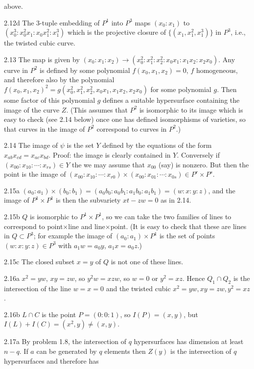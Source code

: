 above. 
\item{2.12d} The 3-tuple embedding of $P^1$ into $P^3$ 
maps $(x_0:x_1)$ to $(x_0^3:x_0^2x_1:x_0x_1^2:x_1^3)$
which is the projective closure of $\{(x_1,x_1^2,x_1^3)\}$ in $P^3$, 
i.e., the twisted cubic curve. 
\item{2.13} The map is given by $(x_0:x_1:x_2)\rightarrow
(x_0^2:x_1^2:x_2^2:x_0x_1:x_1x_2:x_2x_0)$. Any curve in $P^2$ 
is defined by some polynomial $f(x_0,x_1,x_2)=0$, $f$ homogeneous,
and therefore also by the polynomial $f(x_0,x_1,x_2)^2=
g(x_0^2,x_1^2,x_2^2,x_0x_1,x_1x_2,x_2x_0)$ for some polynomial $g$. 
Then some factor of this polynomial $g$ defines a suitable hypersurface containing
the image of the curve $Z$. (This assumes that $P^2$ is isomorphic to its
image which is easy to check (see 2.14 below) once one has defined isomorphisms
of varieties, so that curves in the image of $P^2$ correspond to curves
in $P^2$.)
\item{2.14} The image of $\psi$ is the set $Y$ defined by the equations 
of the form $x_{ab}x_{cd}= x_{ac}x_{bd}$. Proof: the image is clearly 
contained in $Y$. Conversely
if $(x_{00}:x_{10}:\cdots :x_{rs})\in Y$ the we may assume that 
$x_{00}$ (say) is nonzero. But then the point is the image of
$(x_{00}:x_{10}:\cdots :x_{r0})\times(x_{00}:x_{01}:\cdots :x_{0s})\in
P^r\times P^s$. 
\item{2.15a} $(a_0:a_1)\times(b_0:b_1)= (a_0b_0:a_0b_1:a_1b_0:a_1b_1)
=(w:x:y:z)$, and the image of $P^1\times P^1$ is then the 
subvariety $xt-zw=0$ as in 2.14. 
\item{2.15b} $Q$ is isomorphic to $P^1\times P^1$, so we can take
the two families of lines to correspond to point$\times$line
and line$\times$point. (It is easy to check that these
are lines in $Q\subset P^3$; for example the image
of $(a_0:a_1)\times P^1$ is the set of points $(w:x:y:z)\in P^3$
with $a_1w=a_0y$, $a_1x=a_0z$.)
\item{2.15c} The closed subset $x=y$ of $Q$ is not 
one of these lines.
\item{2.16a} $x^2=yw$, $xy=zw$, so $y^2w=xzw$, so $w=0$ or $y^2=xz$.
Hence $Q_1\cap Q_2$ is the intersection of the line
$w=x=0$ and the twisted cubic $x^2=yw, xy=zw, y^2=xz$. 
\item{2.16b} $L\cap C$ is the point $P=(0:0:1)$, so $I(P)=(x,y)$,
but $I(L)+I(C)=(x^2,y)\neq (x,y)$. 
\item{2.17a} By problem 1.8, the intersection of $q$ hypersurfaces
has dimension at least $n-q$. If $a$ can be generated by $q$ elements
then $Z(y)$ is the intersection of $q$ hypersurfaces and therefore has

